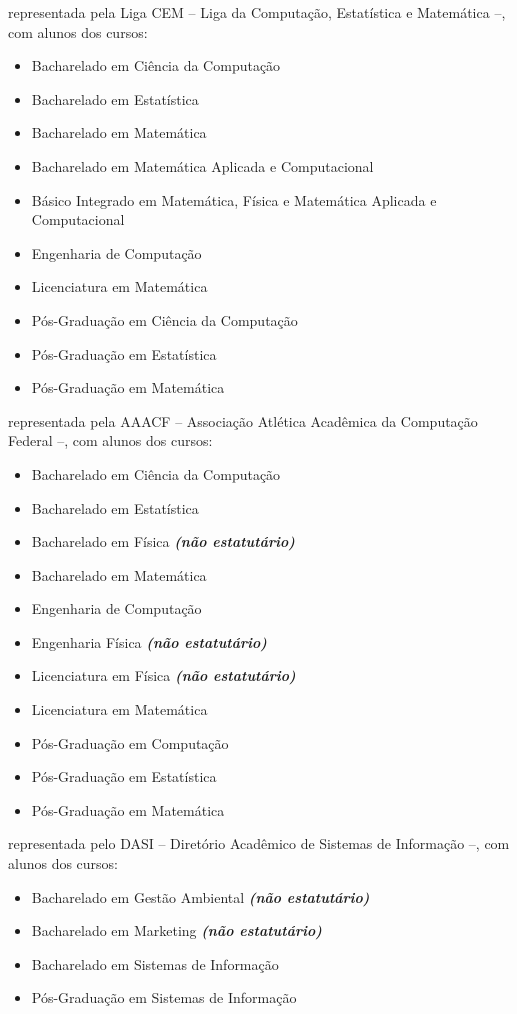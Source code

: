 \begin{article}
\begin{description}[noitemsep]
		\item[UNICAMP - Campinas] representada pela Liga CEM -- Liga da Computação, Estatística e Matemática --, com alunos dos cursos:
		\begin{itemize}[noitemsep]
			\item Bacharelado em Ciência da Computação
			\item Bacharelado em Estatística
			\item Bacharelado em Matemática
			\item Bacharelado em Matemática Aplicada e Computacional
			\item Básico Integrado em Matemática, Física e Matemática Aplicada e Computacional
			\item Engenharia de Computação
			\item Licenciatura em Matemática
			\item Pós-Graduação em Ciência da Computação
			\item Pós-Graduação em Estatística
			\item Pós-Graduação em Matemática
		\end{itemize}

		\item[UFSCar] representada pela AAACF -- Associação Atlética Acadêmica da Computação Federal --, com alunos dos cursos:
		\begin{itemize}[noitemsep]
			\item Bacharelado em Ciência da Computação
			\item Bacharelado em Estatística
			\item Bacharelado em Física \textbf{\textit{(não estatutário)}}
			\item Bacharelado em Matemática
			\item Engenharia de Computação
			\item Engenharia Física \textbf{\textit{(não estatutário)}}
			\item Licenciatura em Física \textbf{\textit{(não estatutário)}}
			\item Licenciatura em Matemática
			\item Pós-Graduação em Computação
			\item Pós-Graduação em Estatística
			\item Pós-Graduação em Matemática
		\end{itemize}

		\item[USP Leste - EACH] representada pelo DASI -- Diretório Acadêmico de Sistemas de Informação --, com alunos dos cursos:
		\begin{itemize}[noitemsep]
			\item Bacharelado em Gestão Ambiental \textbf{\textit{(não estatutário)}}
			\item Bacharelado em Marketing \textbf{\textit{(não estatutário)}}
			\item Bacharelado em Sistemas de Informação
			\item Pós-Graduação em Sistemas de Informação
		\end{itemize}


\end{description}
\end{article}
